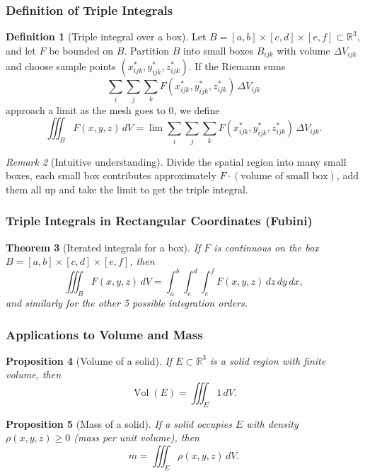 \documentclass[12pt]{article}
\numberwithin{equation}{section}
\newcommand{\RR}{\mathbb{R}}
\theoremstyle{plain}
\newtheorem{theorem}{Theorem}[section]
\newtheorem{proposition}[theorem]{Proposition}
\theoremstyle{definition}
\newtheorem{definition}[theorem]{Definition}
\theoremstyle{remark}
\newtheorem{remark}[theorem]{Remark}
\begin{document}
\subsubsection{Definition of Triple Integrals}

\begin{definition}[Triple integral over a box]\label{def:triple-box}
Let $B=[a,b]\times[c,d]\times[e,f]\subset\RR^3$, and let $F$ be bounded on $B$.
Partition $B$ into small boxes $B_{ijk}$ with volume $\Delta V_{ijk}$ and choose sample points $(x_{ijk}^*,y_{ijk}^*,z_{ijk}^*)$.
If the Riemann sums
\[
\sum_{i}\sum_{j}\sum_{k} F(x_{ijk}^*,y_{ijk}^*,z_{ijk}^*)\,\Delta V_{ijk}
\]
approach a limit as the mesh goes to $0$, we define
\[
\iiint_B F(x,y,z)\,dV=\lim \sum_{i}\sum_{j}\sum_{k} F(x_{ijk}^*,y_{ijk}^*,z_{ijk}^*)\,\Delta V_{ijk}.
\]
\end{definition}

\begin{remark}[Intuitive understanding]
Divide the spatial region into many small boxes, each small box contributes approximately $F\cdot(\text{volume of small box})$, add them all up and take the limit to get the triple integral.
\end{remark}

\subsubsection{Triple Integrals in Rectangular Coordinates (Fubini)}

\begin{theorem}[Iterated integrals for a box]\label{thm:triple-fubini}
If $F$ is continuous on the box $B=[a,b]\times[c,d]\times[e,f]$, then
\[
\iiint_B F(x,y,z)\,dV
=
\int_{a}^{b}\int_{c}^{d}\int_{e}^{f} F(x,y,z)\,dz\,dy\,dx,
\]
and similarly for the other 5 possible integration orders.
\end{theorem}

\subsubsection{Applications to Volume and Mass}

\begin{proposition}[Volume of a solid]\label{prop:volume-solid}
If $E\subset\RR^3$ is a solid region with finite volume, then
\[
\operatorname{Vol}(E)=\iiint_E 1\,dV.
\]
\end{proposition}

\begin{proposition}[Mass of a solid]\label{prop:mass-solid}
If a solid occupies $E$ with density $\rho(x,y,z)\ge 0$ (mass per unit volume), then
\[
m=\iiint_E \rho(x,y,z)\,dV.
\]
\end{proposition}
\end{document}
